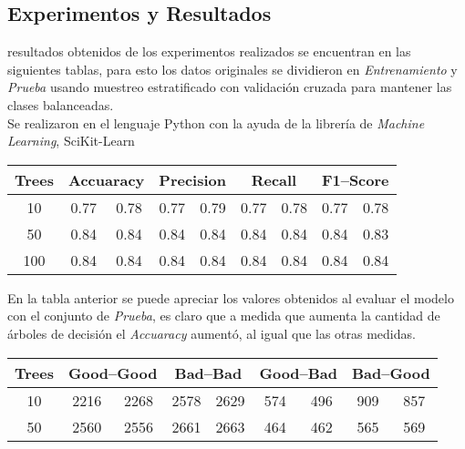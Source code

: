 \documentclass{sciposter}
\begin{document}
\begin{multicols}{3}
\section{Experimentos y Resultados}
 resultados obtenidos de los experimentos realizados se encuentran en las siguientes tablas, para esto los datos originales se dividieron en \emph{Entrenamiento} y \emph{Prueba} usando muestreo estratificado con validaci\'on cruzada para mantener las clases balanceadas.
\\
Se realizaron en el lenguaje Python con la ayuda de la librer\'ia de \emph{Machine Learning}, SciKit-Learn\cite{SciKit:2016}

\begin{table}
\centering
{}\label{tab:2}
\begin{tabular}{ |c|c|c|c|c|c|c|c|c| }
\hline
\multicolumn{1}{|c}{Trees}& \multicolumn{2}{|c|}{Accuaracy}& \multicolumn{2}{c|}{Precision} & \multicolumn{2}{c|}{Recall} & \multicolumn{2}{c|}{F1--Score}\\
\hline
10 & 0.77 & 0.78 & 0.77 & 0.79 & 0.77 & 0.78 & 0.77 & 0.78 \\

50 & 0.84 & 0.84 & 0.84 & 0.84 & 0.84 & 0.84 & 0.84 & 0.83 \\

100& 0.84 & 0.84 & 0.84 & 0.84 & 0.84 & 0.84 & 0.84 & 0.84 \\
\hline
\end{tabular}
\end{table}

En la tabla anterior se puede apreciar los valores obtenidos al evaluar el modelo con el conjunto de \emph{Prueba}, es claro que a medida que aumenta la cantidad de \'arboles de decisi\'on el \emph{Accuaracy} aument\'o, al igual que las otras medidas.

\begin{table}[h]
\centering
{}\label{tab:3}
\begin{tabular}{ |c|c|c|c|c|c|c|c|c| }
\hline
\multicolumn{1}{|c}{Trees}& \multicolumn{2}{|c|}{Good--Good}& \multicolumn{2}{c|}{Bad--Bad} & \multicolumn{2}{c|}{Good--Bad} & \multicolumn{2}{c|}{Bad--Good}\\
\hline
10 & 2216 & 2268 & 2578 & 2629 & 574 & 496 & 909 & 857 \\

50 & 2560 & 2556 & 2661 & 2663 & 464 & 462 & 565 & 569 \\


\end{tabular}
\end{table}
\end{multicols}
\end{document}
